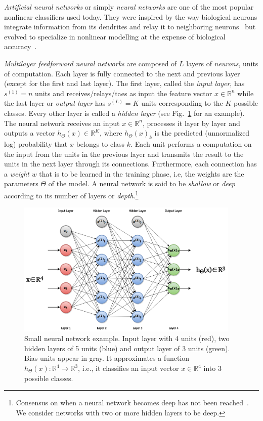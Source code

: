 \emph{Artificial neural networks} or simply \emph{neural networks} are one of the most popular nonlinear classifiers used today. They were inspired by the way biological neurons integrate information from its dendrites and relay it to neighboring neurons~\cite{McCulloch1943, Widrow1960, Rosenblatt1962} but evolved to specialize in nonlinear modelling at the expense of biological accuracy~\cite{Rumelhart1986}.%

\emph{Multilayer feedforward neural networks} are composed of $L$ layers of \emph{neurons}, units of computation. Each layer is fully connected to the next and previous layer (except for the first and last layer). The first layer, called the \emph{input layer}, has $s^{(1)} = n$ units and receives/relays/taes as input the feature vector $x \in \mathbb{R}^n$ while the last layer or \emph{output layer} has $s^{(L)} = K$ units corresponding to the $K$ possible classes. Every other layer is called a \emph{hidden layer} (see Fig.~\ref{fig:NeuralNetwork} for an example). The neural network receives an input $x \in \mathbb{R}^n$, processes it layer by layer and outputs a vector $h_\Theta(x) \in \mathbb{R}^K$, where $h_\Theta(x)_k$ is the predicted (unnormalized log) probability that $x$ belongs to class $k$. Each unit performs a computation on the input from the units in the previous layer and transmits the result to the units in the next layer through its connections. Furthermore, each connection has a \emph{weight} $w$ that is to be learned in the training phase, i.e, the weights are the parameters $\Theta$ of the model. A neural network is said to be \emph{shallow} or \emph{deep} according to its number of layers or \emph{depth}.\footnote{Consensus on when a neural network becomes deep has not been reached~\cite{Schmidhuber2015}. We consider networks with two or more hidden layers to be deep.}

\begin{figure}[h]
	\centering
	\includegraphics[width = 0.95\textwidth]{plots/neuralNetwork.png}
	\caption[Example of an artificial neural network]{Small neural network example. Input layer with 4 units (red), two hidden layers of 5 units (blue) and output layer of 3 units (green). Bias units appear in gray. It approximates a function $h_\Theta(x): \mathbb{R}^4 \to \mathbb{R}^3$, i.e., it classifies an input vector $x \in \mathbb{R}^4$ into 3 possible classes.}
	\label{fig:NeuralNetwork}
\end{figure}

